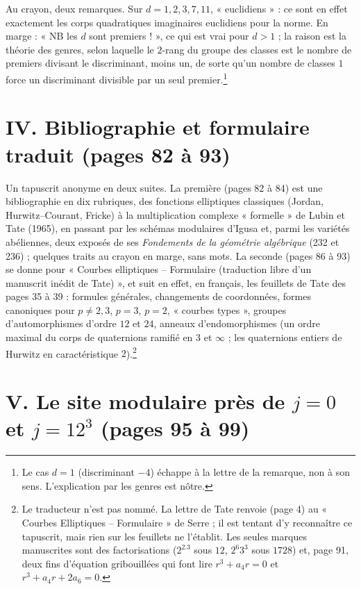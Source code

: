 \documentclass[11pt,a4paper]{article}
\begin{document}
Au crayon, deux remarques. Sur $d = 1, 2, 3, 7, 11$, « euclidiens » : ce sont
en effet exactement les corps quadratiques imaginaires euclidiens pour la
norme. En marge : « NB les $d$ sont premiers ! », ce qui est vrai pour $d > 1$ ; la
raison est la théorie des genres, selon laquelle le $2$-rang du groupe des
classes est le nombre de premiers divisant le discriminant, moins un, de sorte
qu'un nombre de classes $1$ force un discriminant divisible par un seul
premier.\footnote{Le cas $d = 1$ (discriminant $-4$) échappe à la lettre de la
remarque, non à son sens. L'explication par les genres est nôtre.}

\section*{IV. Bibliographie et formulaire traduit (pages 82 à 93)}

Un tapuscrit anonyme en deux suites. La première (pages 82 à 84) est une
bibliographie en dix rubriques, des fonctions elliptiques classiques (Jordan,
Hurwitz--Courant, Fricke) à la multiplication complexe « formelle » de Lubin
et Tate (1965), en passant par les schémas modulaires d'Igusa et, parmi les
variétés abéliennes, deux exposés de ses \emph{Fondements de la géométrie
algébrique} (232 et 236) ; quelques traits au crayon en marge, sans mots. La
seconde (pages 86 à 93) se donne pour « Courbes elliptiques -- Formulaire
(traduction libre d'un manuscrit inédit de Tate) », et suit en effet, en
français, les feuillets de Tate des pages 35 à 39 : formules générales,
changements de coordonnées, formes canoniques pour $p \neq 2,3$, $p=3$, $p=2$,
« courbes types », groupes d'automorphismes d'ordre $12$ et $24$, anneaux
d'endomorphismes (un ordre maximal du corps de quaternions ramifié en $3$ et
$\infty$ ; les quaternions entiers de Hurwitz en caractéristique $2$).\footnote{Le
traducteur n'est pas nommé. La lettre de Tate renvoie (page 4) au « Courbes
Elliptiques -- Formulaire » de Serre ; il est tentant d'y reconnaître ce
tapuscrit, mais rien sur les feuillets ne l'établit. Les seules marques
manuscrites sont des factorisations ($2^2.3$ sous $12$, $2^6 3^3$ sous $1728$)
et, page 91, deux fins d'équation gribouillées qui font lire $r^3 + a_4r = 0$
et $r^3 + a_4r + 2a_6 = 0$.}

\section*{V. Le site modulaire près de $j = 0$ et $j = 12^3$ (pages 95 à 99)}
\end{document}
